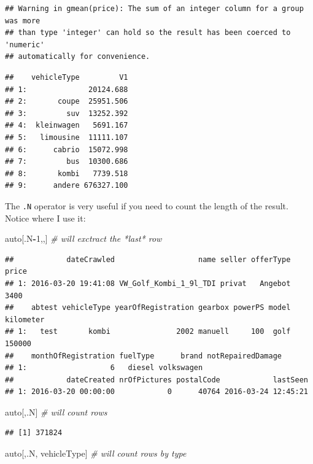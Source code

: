 \documentclass[]{book}
\newenvironment{Shaded}{\begin{snugshade}}{\end{snugshade}}
\newcommand{\DecValTok}[1]{\textcolor[rgb]{0.00,0.00,0.81}{#1}}
\newcommand{\CommentTok}[1]{\textcolor[rgb]{0.56,0.35,0.01}{\textit{#1}}}
\newcommand{\OperatorTok}[1]{\textcolor[rgb]{0.81,0.36,0.00}{\textbf{#1}}}
\newcommand{\NormalTok}[1]{#1}
\theoremstyle{definition}
\theoremstyle{definition}
\theoremstyle{definition}
\theoremstyle{remark}
\begin{document}
\begin{verbatim}
## Warning in gmean(price): The sum of an integer column for a group was more
## than type 'integer' can hold so the result has been coerced to 'numeric'
## automatically for convenience.
\end{verbatim}

\begin{verbatim}
##    vehicleType         V1
## 1:              20124.688
## 2:       coupe  25951.506
## 3:         suv  13252.392
## 4:  kleinwagen   5691.167
## 5:   limousine  11111.107
## 6:      cabrio  15072.998
## 7:         bus  10300.686
## 8:       kombi   7739.518
## 9:      andere 676327.100
\end{verbatim}

The \texttt{.N} operator is very useful if you need to count the length
of the result. Notice where I use it:

\begin{Shaded}
\begin{Highlighting}[]
\NormalTok{auto[.N}\OperatorTok{-}\DecValTok{1}\NormalTok{,,] }\CommentTok{# will exctract the *last* row}
\end{Highlighting}
\end{Shaded}

\begin{verbatim}
##            dateCrawled                   name seller offerType price
## 1: 2016-03-20 19:41:08 VW_Golf_Kombi_1_9l_TDI privat   Angebot  3400
##    abtest vehicleType yearOfRegistration gearbox powerPS model kilometer
## 1:   test       kombi               2002 manuell     100  golf    150000
##    monthOfRegistration fuelType      brand notRepairedDamage
## 1:                   6   diesel volkswagen                  
##            dateCreated nrOfPictures postalCode            lastSeen
## 1: 2016-03-20 00:00:00            0      40764 2016-03-24 12:45:21
\end{verbatim}

\begin{Shaded}
\begin{Highlighting}[]
\NormalTok{auto[,.N] }\CommentTok{# will count rows}
\end{Highlighting}
\end{Shaded}

\begin{verbatim}
## [1] 371824
\end{verbatim}

\begin{Shaded}
\begin{Highlighting}[]
\NormalTok{auto[,.N, vehicleType] }\CommentTok{# will count rows by type}
\end{Highlighting}
\end{Shaded}
\end{document}
